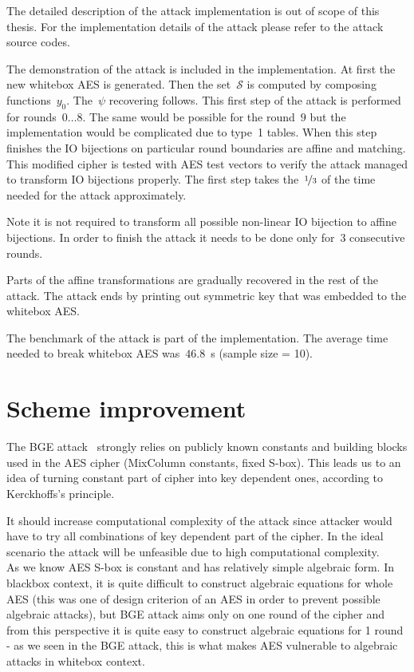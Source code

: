 \documentclass[11pt,oneside,final]{fithesis2}
\begin{document}
    The detailed description of the attack implementation is out of scope of this thesis. For the implementation details of the attack please refer to the attack 
    source codes.

    The demonstration of the attack is included in the implementation. At first the new whitebox AES is generated. Then the set~$\mathcal{S}$ is computed
    by composing functions~$y_0$. The~$\psi$ recovering follows. This first step of the attack is performed for rounds~$0\dots8$. The same would be possible for 
    the round~$9$ but the implementation would be complicated due to type~1 tables. When this step finishes the IO bijections on particular round boundaries
    are affine and matching. This modified cipher is tested with AES test vectors to verify the attack managed to transform IO bijections properly. 
    The first step takes the~$\nicefrac{1}{3}$ of the time needed for the attack approximately.
    
    Note it is not required to transform all possible non-linear IO bijection to affine bijections. In order to finish the attack it needs to be done only for~3 consecutive rounds.
    
    Parts of the affine transformations are gradually recovered in the rest of the attack. The attack ends by printing out symmetric key that was embedded to the whitebox AES.
    
    The benchmark of the attack is part of the implementation. The average time needed to break whitebox AES was~$46.8$~s (sample size = 10).
    
    \chapter{Scheme improvement}
    The BGE attack~\citep{Billet:2004:CWB:2080787.2080809} strongly relies on publicly known constants and building blocks used in the AES cipher (MixColumn constants, fixed S-box). 
    This leads us to an idea of turning constant part of cipher into key dependent ones, according to Kerckhoffs's principle. 

    It should increase computational complexity of the attack since attacker would have to try
    all combinations of key dependent part of the cipher. In the ideal scenario the attack will be unfeasible due to high computational complexity. \\
    
    As we know AES S-box is constant and has relatively simple algebraic form. In blackbox context, it is quite difficult to construct algebraic equations for whole AES (this was 
    one of design criterion of an AES in order to prevent possible algebraic attacks), but BGE attack aims only on one round of the cipher and from this perspective it is 
    quite easy to construct algebraic equations for 1 round - as we seen in the BGE attack, this is what makes AES vulnerable to algebraic attacks in whitebox context.\\
    
\end{document}
